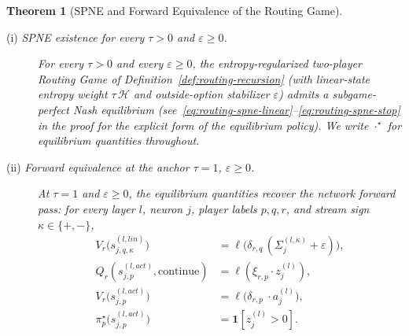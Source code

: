 \documentclass[twoside]{article}
\newcommand{\1}{\mathbf{1}}
\newtheorem{theorem}{Theorem}
\begin{document}
\begin{theorem}[SPNE and Forward Equivalence of the Routing Game]\label{thm:routing-forward}
\leavevmode
\begin{description}
    \item[\textnormal{(i) \emph{SPNE existence for every $\tau > 0$ and $\varepsilon \ge 0$.}}]
        For every $\tau > 0$ and every $\varepsilon \ge 0$, the entropy-regularized two-player Routing Game
        of Definition~\ref{def:routing-recursion} (with linear-state entropy weight $\tau\,\mathcal{H}$ and
        outside-option stabilizer $\varepsilon$) admits a subgame-perfect Nash equilibrium
        (see~\eqref{eq:routing-spne-linear}--\eqref{eq:routing-spne-stop} in the proof for the explicit
        form of the equilibrium policy). We write $\cdot^\star$ for equilibrium quantities throughout.

    \item[\textnormal{(ii) \emph{Forward equivalence at the anchor $\tau=1$, $\varepsilon\geq 0$.}}]
        At $\tau=1$ and $\varepsilon \geq 0$, the equilibrium quantities recover the network forward pass:
        for every layer $l$, neuron $j$, player labels $p,q,r$, and stream sign $\kappa\in\{+,-\}$,
        \begin{align}
            V_r\bigl(s_{j,q,\kappa}^{(l, lin)}\bigr) &= \ell\bigl(\delta_{r,q} \, (\Sigma_j^{(l,\kappa)} +
            \varepsilon)\bigr), \label{eq:routing-forward-linear}\\
            Q_r\left( s_{j,p}^{(l, act)}, \text{continue} \right) &= \ell \left( \xi_{r,p} \cdot z^{(l)}_j
            \right), \label{eq:routing-forward-continue} \\
            V_r\bigl(s_{j,p}^{(l, act)}\bigr) &= \ell\bigl( \delta_{r,p}\ \cdot a_j^{(l)} \bigr),
            \label{eq:routing-forward-act}\\
            \pi_p^\star\bigl(s_{j,p}^{(l, act)}\bigr) &= \1[z_j^{(l)} > 0]. \label{eq:routing-forward-stop}
        \end{align}
\end{description}
\end{theorem}
\end{document}
